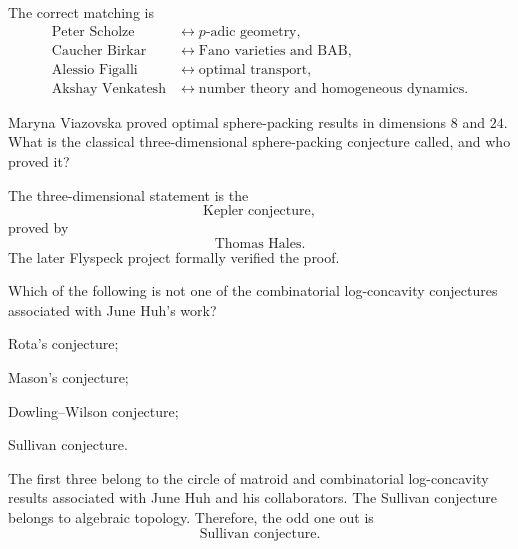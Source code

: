     \begin{solution}
        The correct matching is
        \[
            \boxed{
                \begin{aligned}
                    \text{Peter Scholze}
                    &\longleftrightarrow p\text{-adic geometry},\\
                    \text{Caucher Birkar}
                    &\longleftrightarrow \text{Fano varieties and BAB},\\
                    \text{Alessio Figalli}
                    &\longleftrightarrow \text{optimal transport},\\
                    \text{Akshay Venkatesh}
                    &\longleftrightarrow
                    \text{number theory and homogeneous dynamics}.
                \end{aligned}
            }
        \]
    \end{solution}

    \begin{expectedproblem}
        Maryna Viazovska proved optimal sphere-packing results in dimensions
        $8$ and $24$. What is the classical three-dimensional sphere-packing
        conjecture called, and who proved it?
    \end{expectedproblem}

    \begin{solution}
        The three-dimensional statement is the
        \[
            \boxed{\text{Kepler conjecture}},
        \]
        proved by
        \[
            \boxed{\text{Thomas Hales}}.
        \]
        The later Flyspeck project formally verified the proof.
    \end{solution}

    \begin{expectedproblem}
        Which of the following is not one of the combinatorial log-concavity
        conjectures associated with June Huh's work?
        \begin{problemchoices}
            \item Rota's conjecture;
            \item Mason's conjecture;
            \item Dowling--Wilson conjecture;
            \item Sullivan conjecture.
        \end{problemchoices}
    \end{expectedproblem}

    \begin{solution}
        The first three belong to the circle of matroid and combinatorial
        log-concavity results associated with June Huh and his collaborators.
        The Sullivan conjecture belongs to algebraic topology. Therefore, the
        odd one out is
        \[
            \boxed{\text{Sullivan conjecture}}.
        \]
    \end{solution}

